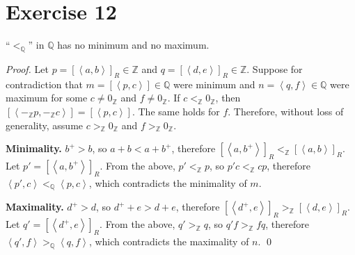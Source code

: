 \documentclass[11pt]{llncs}
\begin{document}
\section*{Exercise 12}
\begin{lemma}
  ``$<_\mathbb{Q}$'' in $\mathbb{Q}$ has no minimum and no maximum.
\end{lemma}
\begin{proof}
  Let $p = [\left<a, b\right>]_R \in \mathbb{Z}$
  and $q = [\left<d, e\right>]_R \in \mathbb{Z}$.
  Suppose for contradiction that
  $m = [\left<p, c\right>] \in \mathbb{Q}$ were
  minimum and
  $n = \left<q, f\right> \in \mathbb{Q}$ were maximum for some
  $c \neq 0_\mathbb{Z}$
  and
  $f \neq 0_\mathbb{Z}$.
  If $c <_\mathbb{Z} 0_\mathbb{Z}$, then
  $[\left<-_\mathbb{Z}p, -_\mathbb{Z}c\right>] = [\left<p, c\right>]$.
  The same holds for $f$.
  Therefore, without loss of generality, assume
  $c >_\mathbb{Z} 0_\mathbb{Z}$ and
  $f >_\mathbb{Z} 0_\mathbb{Z}$.

  \item{\bf Minimality.}
  $b^+ > b$, so
  $a + b < a + b^+$, therefore
  $[\left<a, b^+\right>]_R <_\mathbb{Z} [\left<a, b\right>]_R$.
  Let $p' = [\left<a, b^+\right>]_R$.
  From the above,
  $p' <_\mathbb{Z} p$, so
  $p'c <_\mathbb{Z} cp$, therefore
  $\left<p', c\right> <_\mathbb{Q} \left<p, c\right>$, which contradicts the
  minimality of $m$.

  \item{\bf Maximality.}
  $d^+ > d$, so
  $d^+ + e > d + e$, therefore
  $[\left<d^+, e\right>]_R >_\mathbb{Z} [\left<d, e\right>]_R$.
  Let $q' = [\left<d^+, e\right>]_R$.
  From the above,
  $q' >_\mathbb{Z} q$, so
  $q'f >_\mathbb{Z} fq$, therefore
  $\left<q', f\right> >_\mathbb{Q} \left<q, f\right>$, which contradicts the
  maximality of $n$.
  \qed
\end{proof}
\end{document}
